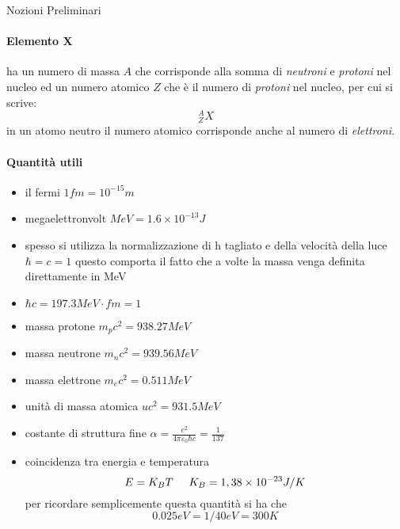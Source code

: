 
\begin{center}
\begin{huge}
Nozioni Preliminari
\end{huge}
\end{center}
\vspace{1cm}

\paragraph{Elemento X} ha un numero di massa $A$ che corrisponde alla somma di \emph{neutroni} e \emph{protoni} nel nucleo ed un numero atomico $Z$ che è il numero di \emph{protoni} nel nucleo, per cui si scrive:
$$^{A}_{Z} X$$
in un atomo neutro il numero atomico corrisponde anche al numero di \emph{elettroni}.

\paragraph{Quantità utili}
\begin{itemize}
\item il fermi $1fm=10^{-15}m$
\item megaelettronvolt $MeV=1.6\times 10^{-13}J$
\item spesso si utilizza la normalizzazione di h tagliato e della velocità della luce $\hbar=c=1$  questo comporta il fatto che a volte la massa venga definita direttamente in MeV
\item $\hbar c=197.3MeV\cdot fm=1$
\item massa protone $m_pc^2=938.27MeV$
\item massa neutrone $m_nc^2=939.56 MeV$
\item massa elettrone $m_ec^2=0.511MeV$
\item unità di massa atomica $uc^2=931.5MeV$
\item costante di struttura fine $\alpha=\frac{e^2}{4\pi\varepsilon_0\hbar c}=\frac{1}{137}$
\item coincidenza tra energia e temperatura \[E=K_B T \hspace{0.5cm} K_B=1,38 \times 10^{-23}J/K\] per ricordare semplicemente questa quantità si ha che \[0.025eV=1/40eV=300K\]
\end{itemize}



\newpage
